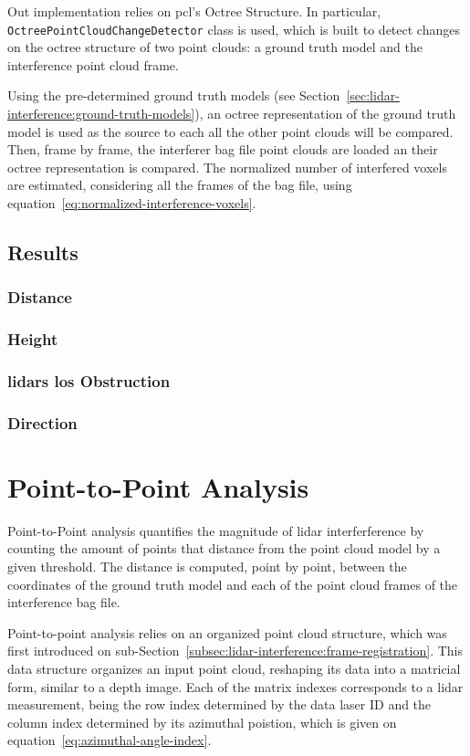 Out implementation relies on \ac{pcl}'s Octree Structure. In particular, \texttt{OctreePointCloudChangeDetector} class is used, which is built to detect changes on the octree structure of two point clouds: a ground truth model and the interference point cloud frame. 

Using the pre-determined ground truth models (see Section~\ref{sec:lidar-interference:ground-truth-models}), an octree representation of the ground truth model is used as the source to each all the other point clouds will be compared. Then, frame by frame, the interferer bag file point clouds are loaded an their octree representation is compared. The normalized number of interfered voxels are estimated, considering all the frames of the bag file, using equation~\ref{eq:normalized-interference-voxels}.


\subsection{Results}

\subsubsection{Distance}
\subsubsection{Height}
\subsubsection{\acp{lidar} \ac{los} Obstruction}
\subsubsection{Direction}

\section{Point-to-Point Analysis}
Point-to-Point analysis quantifies the magnitude of \ac{lidar} interferference by counting the amount of points that distance from the point cloud model by a given threshold. The distance is computed, point by point, between the coordinates of the ground truth model and each of the point cloud frames of the interference bag file. 

Point-to-point analysis relies on an organized point cloud structure, which was first introduced on sub-Section~\ref{subsec:lidar-interference:frame-registration}. This data structure organizes an input point cloud, reshaping its data into a matricial form, similar to a depth image. Each of the matrix indexes corresponds to a \ac{lidar} measurement, being the row index determined by the data \ac{laser} ID and the column index determined by its azimuthal poistion, which is given on equation~\ref{eq:azimuthal-angle-index}. 

